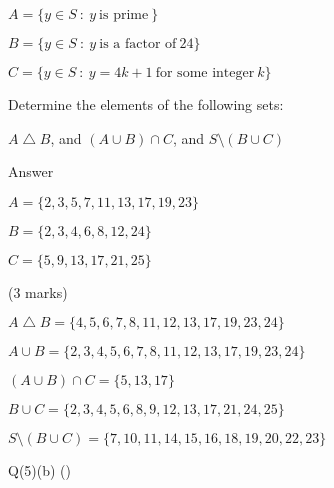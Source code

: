 \documentclass[a4paper,12pt,oneside]{book}
\theoremstyle{definition}
\begin{document}
$A = \{ y \in S \ : \ y \ \text{is prime} \ \}$

$B = \{ y \in S \ : \ y \ \text{is a factor of} \ 24 \}$

$C = \{ y \in S \ : \ y = 4k+1 \ \text{for some integer} \ k \}$

Determine the elements of the following sets:

$A \bigtriangleup B$, and $(A \cup B) \cap C$, and $S \setminus (B \cup C)$

Answer

$A = \{ 2,3,5,7,11,13,17,19,23 \}$

$B = \{ 2,3,4,6,8,12,24 \}$

$C = \{ 5,9,13,17,21,25 \}$

(3 marks)

$A \bigtriangleup B = \{ 4, 5, 6, 7, 8, 11, 12, 13, 17, 19, 23, 24 \}$

$A \cup B = \{ 2,3,4,5,6,7,8,11,12,13,17,19,23,24 \}$

$(A \cup B) \cap C = \{ 5, 13, 17 \}$

$B \cup C = \{ 2,3,4,5,6,8,9,12,13,17,21,24,25 \}$

$S \setminus (B \cup C) = \{ 7, 10, 11, 14, 15, 16, 18, 19, 20, 22, 23 \}$

Q(5)(b) ()
\end{document}
